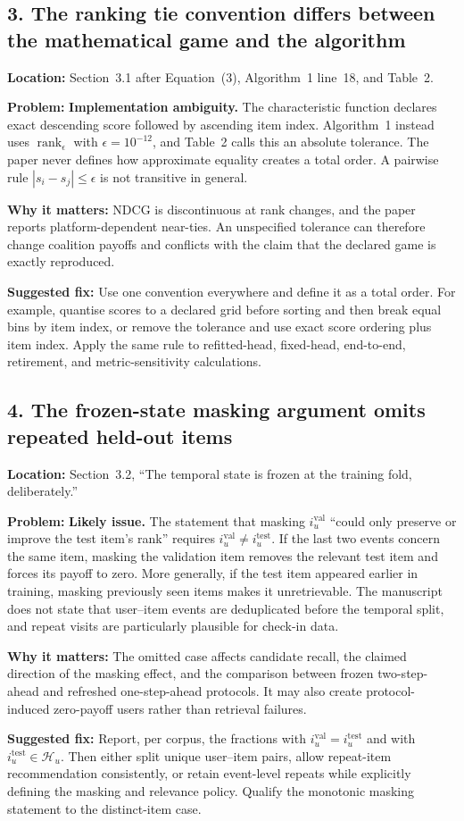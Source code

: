 \documentclass[11pt]{article}
\newcommand{\loc}[1]{\par\noindent\textbf{Location:} #1\par}
\newcommand{\problem}[1]{\noindent\textbf{Problem:} #1\par}
\newcommand{\impact}[1]{\noindent\textbf{Why it matters:} #1\par}
\newcommand{\fix}[1]{\noindent\textbf{Suggested fix:} #1\par}
\begin{document}
\subsection*{3. The ranking tie convention differs between the mathematical game and the algorithm}

\loc{Section~3.1 after Equation~(3), Algorithm~1 line~18, and Table~2.}
\problem{\textbf{Implementation ambiguity.} The characteristic function declares exact descending score followed by ascending item index.  Algorithm~1 instead uses $\operatorname{rank}_{\epsilon}$ with $\epsilon=10^{-12}$, and Table~2 calls this an absolute tolerance.  The paper never defines how approximate equality creates a total order.  A pairwise rule $|s_i-s_j|\le\epsilon$ is not transitive in general.}
\impact{NDCG is discontinuous at rank changes, and the paper reports platform-dependent near-ties.  An unspecified tolerance can therefore change coalition payoffs and conflicts with the claim that the declared game is exactly reproduced.}
\fix{Use one convention everywhere and define it as a total order.  For example, quantise scores to a declared grid before sorting and then break equal bins by item index, or remove the tolerance and use exact score ordering plus item index.  Apply the same rule to refitted-head, fixed-head, end-to-end, retirement, and metric-sensitivity calculations.}

\subsection*{4. The frozen-state masking argument omits repeated held-out items}

\loc{Section~3.2, ``The temporal state is frozen at the training fold, deliberately.''}
\problem{\textbf{Likely issue.} The statement that masking $i_u^{\mathrm{val}}$ ``could only preserve or improve the test item's rank'' requires $i_u^{\mathrm{val}}\ne i_u^{\mathrm{test}}$.  If the last two events concern the same item, masking the validation item removes the relevant test item and forces its payoff to zero.  More generally, if the test item appeared earlier in training, masking previously seen items makes it unretrievable.  The manuscript does not state that user--item events are deduplicated before the temporal split, and repeat visits are particularly plausible for check-in data.}
\impact{The omitted case affects candidate recall, the claimed direction of the masking effect, and the comparison between frozen two-step-ahead and refreshed one-step-ahead protocols.  It may also create protocol-induced zero-payoff users rather than retrieval failures.}
\fix{Report, per corpus, the fractions with $i_u^{\mathrm{val}}=i_u^{\mathrm{test}}$ and with $i_u^{\mathrm{test}}\in\mathcal H_u$.  Then either split unique user--item pairs, allow repeat-item recommendation consistently, or retain event-level repeats while explicitly defining the masking and relevance policy.  Qualify the monotonic masking statement to the distinct-item case.}
\end{document}
